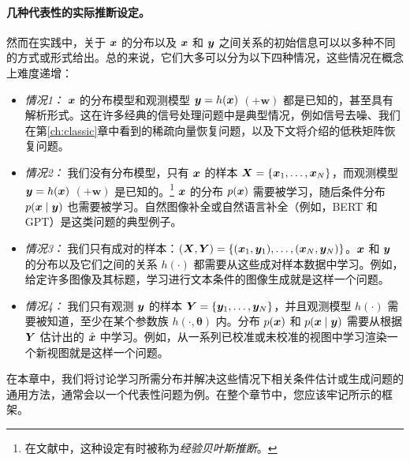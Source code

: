 \documentclass[../../book-main.tex]{subfiles}
\begin{document}
\paragraph{几种代表性的实际推断设定。} 
然而在实践中，关于 $\bm{x}$ 的分布以及 $\bm{x}$ 和 $\bm{y}$ 之间关系的初始信息可以以多种不同的方式或形式给出。总的来说，它们大多可以分为以下四种情况，这些情况在概念上难度递增：
\begin{itemize}
\item {\em 情况1：} $\bm{x}$ 的分布模型和观测模型 $\bm{y} = h(\bm{x})$ $(+ \boldsymbol{w})$ 都是已知的，甚至具有解析形式。这在许多经典的信号处理问题中是典型情况，例如信号去噪、我们在第\ref{ch:classic}章中看到的稀疏向量恢复问题，以及下文将介绍的低秩矩阵恢复问题。
\item {\em 情况2：} 我们没有分布模型，只有 $\bm{x}$ 的样本 $\bm{X} = \{\bm{x}_1, \ldots, \bm{x}_N\}$，而观测模型 $\bm{y} = h(\bm{x})$ $ (+ \boldsymbol{w})$ 是已知的。\footnote{在文献中，这种设定有时被称为{\em 经验贝叶斯推断}。} $\bm{x}$ 的分布 $p(\bm{x})$ 需要被学习，随后条件分布 $p(\bm{x}\mid \bm{y})$ 也需要被学习。自然图像补全或自然语言补全（例如，BERT 和 GPT）是这类问题的典型例子。
\item {\em 情况3：} 我们只有成对的样本：$(\bm{X}, \bm{Y}) = \{ (\bm{x}_1, \bm{y}_1), \ldots, (\bm{x}_N, \bm{y}_N) \}$。$\bm{x}$ 和 $\bm{y}$ 的分布以及它们之间的关系 $h(\cdot)$ 都需要从这些成对样本数据中学习。例如，给定许多图像及其标题，学习进行文本条件的图像生成就是这样一个问题。
\item {\em 情况4：} 我们只有观测 $\bm{y}$ 的样本 $\bm{Y} = \{\bm{y}_1, \ldots, \bm{y}_N\}$，并且观测模型 $h(\cdot)$ 需要被知道，至少在某个参数族 $h(\cdot, \boldsymbol{\theta})$ 内。分布 $p(\bm{x})$ 和 $p(\bm{x} \mid \bm{y})$ 需要从根据 $\bm{Y}$ 估计出的 $\hat {\bm{x}}$ 中学习。例如，从一系列已校准或未校准的视图中学习渲染一个新视图就是这样一个问题。
\end{itemize}
在本章中，我们将讨论学习所需分布并解决这些情况下相关条件估计或生成问题的通用方法，通常会以一个代表性问题为例。在整个章节中，您应该牢记所示的框架。

\end{document}
